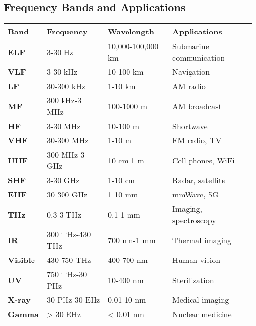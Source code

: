 \begin{center}
\end{center}

\subsection{Frequency Bands and Applications}

{\def\LTcaptype{} %
\begin{longtable}[]{@{}llll@{}}
\toprule\noalign{}
Band & Frequency & Wavelength & Applications \\
\midrule\noalign{}
\endhead
\bottomrule\noalign{}
\endlastfoot
\textbf{ELF} & 3-30 Hz & 10,000-100,000 km & Submarine communication \\
\textbf{VLF} & 3-30 kHz & 10-100 km & Navigation \\
\textbf{LF} & 30-300 kHz & 1-10 km & AM radio \\
\textbf{MF} & 300 kHz-3 MHz & 100-1000 m & AM broadcast \\
\textbf{HF} & 3-30 MHz & 10-100 m & Shortwave \\
\textbf{VHF} & 30-300 MHz & 1-10 m & FM radio, TV \\
\textbf{UHF} & 300 MHz-3 GHz & 10 cm-1 m & Cell phones, WiFi \\
\textbf{SHF} & 3-30 GHz & 1-10 cm & Radar, satellite \\
\textbf{EHF} & 30-300 GHz & 1-10 mm & mmWave, 5G \\
\textbf{THz} & 0.3-3 THz & 0.1-1 mm & Imaging, spectroscopy \\
\textbf{IR} & 300 THz-430 THz & 700 nm-1 mm & Thermal imaging \\
\textbf{Visible} & 430-750 THz & 400-700 nm & Human vision \\
\textbf{UV} & 750 THz-30 PHz & 10-400 nm & Sterilization \\
\textbf{X-ray} & 30 PHz-30 EHz & 0.01-10 nm & Medical imaging \\
\textbf{Gamma} & \textgreater{} 30 EHz & \textless{} 0.01 nm & Nuclear medicine \\
\end{longtable}
}

